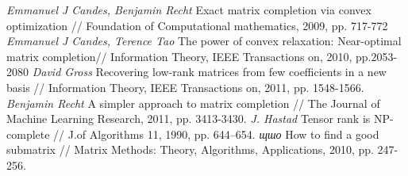 \documentclass[14pt]{extarticle}
\begin{document}
    
    \tableofcontents
    \newpage
     \clearpage
     \clearpage
    \clearpage
    \clearpage
    \begin{thebibliography}{100}
        {\it Emmanuel J Candes, Benjamin Recht}
            Exact matrix completion via convex optimization // Foundation of Computational mathematics, 2009, pp. 717-772
        {\it Emmanuel J Candes, Terence Tao}
            The power of convex relaxation: Near-optimal matrix completion// Information Theory, IEEE Transactions on, 2010, pp.2053-2080
		{\it David Gross}
           Recovering low-rank matrices from few coefficients in a new basis // Information Theory, IEEE Transactions on, 2011, pp. 1548-1566.
        {\it  Benjamin Recht}
              A simpler approach to matrix completion // The Journal of Machine Learning Research, 2011, pp. 3413-3430.
        {\it J. Hastad}
              Tensor rank is NP-complete // J.of Algorithms 11, 1990, pp. 644–654.
        {\it щшо  }
               How to find a good submatrix // Matrix Methods: Theory, Algorithms, Applications, 2010, pp. 247-256.
    \end{thebibliography}
\end{document}
